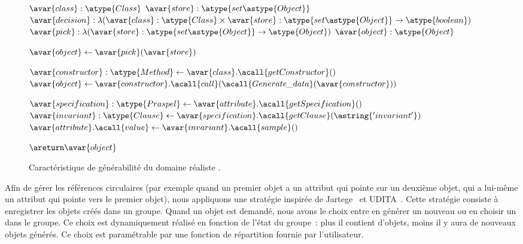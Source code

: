\begin{figure}

\begin{center}
\begin{algorithmic}


  \Require $\avar{class}: \atype{Class}$
  \Require $\avar{store}: \atype{set\astype{Object}}$
  \Require $\avar{decision}: \lambda ( \avar{class}: \atype{Class} \times \avar{store}: \atype{set\astype{Object}} \rightarrow \atype{boolean} )$
  \Require $\avar{pick}: \lambda ( \avar{store}: \atype{set\astype{Object}} \rightarrow \atype{Object} )$
  \Ensure  $\avar{object}: \atype{Object}$


      \State $\avar{object} \gets \avar{pick}(\avar{store})$

  \Else

      \State $\avar{constructor}: \atype{Method} \gets \avar{class}.\acall{getConstructor}()$
      \State $\avar{object} \gets \avar{constructor}.\acall{call}(\acall{Generate\_data}(\avar{constructor}))$


          \State $\avar{specification}: \atype{Praspel} \gets \avar{attribute}.\acall{getSpecification}()$
          \State $\avar{invariant}: \atype{Clause} \gets \avar{specification}.\acall{getClause}(\astring{'invariant'})$
          \State $\avar{attribute}.\acall{value} \gets \avar{invariant}.\acall{sample}()$

      \EndFor

  \EndIf

  \State $\areturn \avar{object}$

\EndFunction

\end{algorithmic}
\end{center}

\caption{\label{figure:data:object} Caractéristique de générabilité du domaine
réaliste .}

\end{figure}

Afin de gérer les références circulaires (par exemple quand un premier objet a
un attribut qui pointe sur un deuxième objet, qui a lui-même un attribut qui
pointe vers le premier objet), nous appliquons une stratégie inspirée de
Jartege~ et UDITA~. Cette stratégie
consiste à enregistrer les objets créés dans un groupe. Quand un objet est
demandé, nous avons le choix entre en générer un nouveau ou en choisir un dans
le groupe. Ce choix est dynamiquement réalisé en fonction de l'état du groupe~:
plus il contient d'objets, moins il y aura de nouveaux objets générés. Ce choix
est paramétrable par une fonction de répartition fournie par l'utilisateur.
